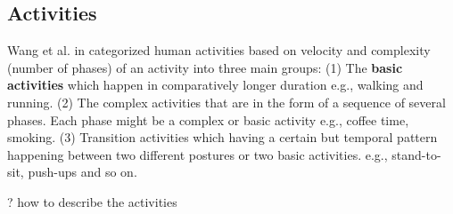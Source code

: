 \documentclass[journal,article,submit,moreauthors,pdftex]{Definitions/mdpi}
\begin{document}

\subsection{Activities}

Wang et al. in \cite{wang2019survey} categorized human activities based on velocity and complexity (number of phases) of an activity into three main groups: (1) The \textbf{basic activities} which happen in comparatively longer duration e.g., walking and running. (2)  The complex activities that are in the form of a sequence of several phases. Each phase might be a complex or basic activity e.g., coffee time, smoking. (3) Transition activities which having a certain but temporal pattern happening between two different postures or two basic activities. e.g., stand-to-sit, push-ups and so on. 


? how to describe the activities
\end{document}
